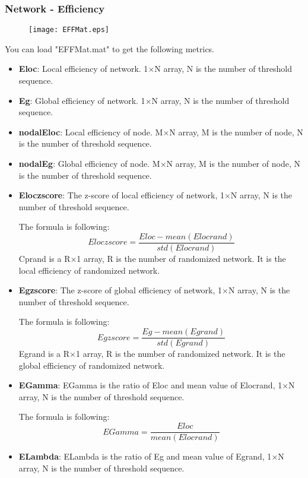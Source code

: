 \documentclass[11pt]{article}
\begin{document}
			\subsubsection{Network - Efficiency}
				\begin{figure}
					\begin{center}
						\texttt{[image: EFFMat.eps]}
					\end{center}
				\end{figure}
				You can load "EFFMat.mat" to get the following metrics.
				\begin{itemize}
					\item \textbf{Eloc}: Local efficiency of network.
						1$\times$N array, N is the number of threshold sequence.
					\item \textbf{Eg}: Global efficiency of network.
						1$\times$N array, N is the number of threshold sequence.
					\item \textbf{nodalEloc}: Local efficiency of node.
						M$\times$N array, M is the number of node, N is the number of threshold sequence.
					\item \textbf{nodalEg}: Global efficiency of node.
						M$\times$N array, M is the number of node, N is the number of threshold sequence.
					\item \textbf{Eloczscore}: The z-score of local efficiency of network, 
						1$\times$N array, N is the number of threshold sequence.

						The formula is following:
						$$Eloczscore=\frac{Eloc-mean(Elocrand)}{std(Elocrand)}$$
						Cprand is a R$\times$1 array, R is the number of randomized network. 
						It is the local efficiency of randomized network.
					\item \textbf{Egzscore}: The z-score of global efficiency of network,
						1$\times$N array, N is the number of threshold sequence.

						The formula is following:
						$$Egzscore=\frac{Eg-mean(Egrand)}{std(Egrand)}$$
						Egrand is a R$\times$1 array, R is the number of randomized network. 
						It is the global efficiency of randomized network.
					\item \textbf{EGamma}: EGamma is the ratio of Eloc and mean value of Elocrand,
						1$\times$N array, N is the number of threshold sequence.
						
						The formula is following:
						$$EGamma=\frac{Eloc}{mean(Elocrand)}$$
					\item \textbf{ELambda}: ELambda is the ratio of Eg and mean value of Egrand,
						1$\times$N array, N is the number of threshold sequence.
						

\end{itemize}
\end{document}
